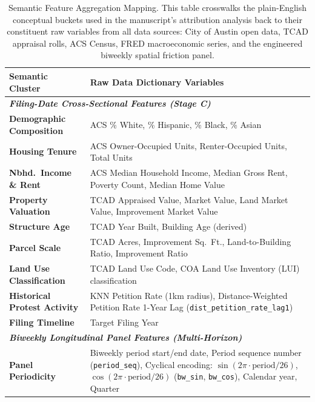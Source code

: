 \begin{table}[htbp]
    \centering
    \caption[Semantic Feature Aggregation Mapping]{Semantic Feature Aggregation Mapping. This table crosswalks the plain-English conceptual buckets used in the manuscript's attribution analysis back to their constituent raw variables from all data sources: City of Austin open data, TCAD appraisal rolls, ACS Census, FRED macroeconomic series, and the engineered biweekly spatial friction panel.}
    \label{tab:semantic_mapping}
    \renewcommand{\arraystretch}{1.3}
    \begin{tabular}{@{}p{} p{}@{}}
        \toprule
        \textbf{Semantic Cluster} & \textbf{Raw Data Dictionary Variables} \\
        \midrule
        \multicolumn{2}{l}{\textit{\textbf{Filing-Date Cross-Sectional Features (Stage C)}}} \\[2pt]
        \textbf{Demographic Composition}   & ACS \% White, \% Hispanic, \% Black, \% Asian \\
        \textbf{Housing Tenure}            & ACS Owner-Occupied Units, Renter-Occupied Units, Total Units \\
        \textbf{Nbhd.\ Income \& Rent}     & ACS Median Household Income, Median Gross Rent, Poverty Count, Median Home Value \\
        \textbf{Property Valuation}        & TCAD Appraised Value, Market Value, Land Market Value, Improvement Market Value \\
        \textbf{Structure Age}             & TCAD Year Built, Building Age (derived) \\
        \textbf{Parcel Scale}              & TCAD Acres, Improvement Sq.\ Ft., Land-to-Building Ratio, Improvement Ratio \\
        \textbf{Land Use Classification}   & TCAD Land Use Code, COA Land Use Inventory (LUI) classification \\
        \textbf{Historical Protest Activity} & KNN Petition Rate (1km radius), Distance-Weighted Petition Rate 1-Year Lag (\texttt{dist\_petition\_rate\_lag1}) \\
        \textbf{Filing Timeline}           & Target Filing Year \\
        \midrule
        \multicolumn{2}{l}{\textit{\textbf{Biweekly Longitudinal Panel Features (Multi-Horizon)}}} \\[2pt]
        \textbf{Panel Periodicity}         & Biweekly period start/end date, Period sequence number (\texttt{period\_seq}), Cyclical encoding: $\sin(2\pi \cdot \text{period}/26)$, $\cos(2\pi \cdot \text{period}/26)$ (\texttt{bw\_sin}, \texttt{bw\_cos}), Calendar year, Quarter \\

\end{tabular}
\end{table}
